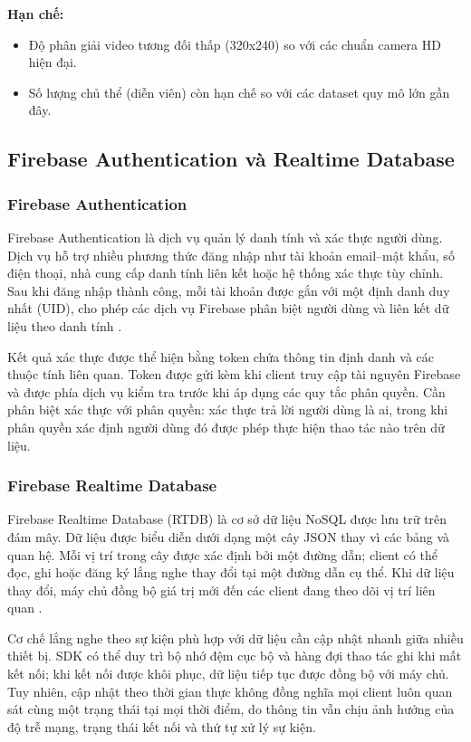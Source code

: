 \textbf{Hạn chế:}
\begin{itemize}
    \item Độ phân giải video tương đối thấp (320x240) so với các chuẩn camera HD hiện đại.
    \item Số lượng chủ thể (diễn viên) còn hạn chế so với các dataset quy mô lớn gần đây.
\end{itemize}

\subsection{Firebase Authentication và Realtime Database}

\subsubsection{Firebase Authentication}

Firebase Authentication là dịch vụ quản lý danh tính và xác thực người dùng. Dịch vụ hỗ trợ nhiều phương thức đăng nhập như tài khoản email--mật khẩu, số điện thoại, nhà cung cấp danh tính liên kết hoặc hệ thống xác thực tùy chỉnh. Sau khi đăng nhập thành công, mỗi tài khoản được gắn với một định danh duy nhất (UID), cho phép các dịch vụ Firebase phân biệt người dùng và liên kết dữ liệu theo danh tính .

Kết quả xác thực được thể hiện bằng token chứa thông tin định danh và các thuộc tính liên quan. Token được gửi kèm khi client truy cập tài nguyên Firebase và được phía dịch vụ kiểm tra trước khi áp dụng các quy tắc phân quyền. Cần phân biệt xác thực với phân quyền: xác thực trả lời người dùng là ai, trong khi phân quyền xác định người dùng đó được phép thực hiện thao tác nào trên dữ liệu.

\subsubsection{Firebase Realtime Database}

Firebase Realtime Database (RTDB) là cơ sở dữ liệu NoSQL được lưu trữ trên đám mây. Dữ liệu được biểu diễn dưới dạng một cây JSON thay vì các bảng và quan hệ. Mỗi vị trí trong cây được xác định bởi một đường dẫn; client có thể đọc, ghi hoặc đăng ký lắng nghe thay đổi tại một đường dẫn cụ thể. Khi dữ liệu thay đổi, máy chủ đồng bộ giá trị mới đến các client đang theo dõi vị trí liên quan .

Cơ chế lắng nghe theo sự kiện phù hợp với dữ liệu cần cập nhật nhanh giữa nhiều thiết bị. SDK có thể duy trì bộ nhớ đệm cục bộ và hàng đợi thao tác ghi khi mất kết nối; khi kết nối được khôi phục, dữ liệu tiếp tục được đồng bộ với máy chủ. Tuy nhiên, cập nhật theo thời gian thực không đồng nghĩa mọi client luôn quan sát cùng một trạng thái tại mọi thời điểm, do thông tin vẫn chịu ảnh hưởng của độ trễ mạng, trạng thái kết nối và thứ tự xử lý sự kiện.

